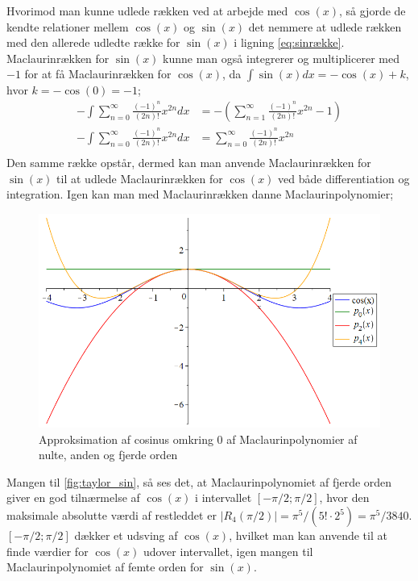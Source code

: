 Hvorimod man kunne udlede rækken ved at arbejde med $\cos(x)$, så gjorde de kendte relationer mellem $\cos(x)$ og $\sin(x)$ det nemmere at udlede rækken med den allerede udledte række for $\sin(x)$ i ligning \ref{eq:sinrække}. Maclaurinrækken  for $\sin(x)$ kunne man også integrerer og multiplicerer med $-1$ for at få Maclaurinrækken for $\cos(x)$, da $\int \sin(x) dx=-\cos(x)+k$, hvor $k=-\cos(0)=-1$;
\begin{align*}
-\int \sum_{n=0}^{\infty} \frac{(-1)^n}{(2n)!}x^{2n} dx
&=
-\left(\sum_{n=1}^{\infty} \frac{(-1)^n}{(2n)!}x^{2n}-1\right) \\
-\int \sum_{n=0}^{\infty} \frac{(-1)^n}{(2n)!}x^{2n} dx
&=
\sum_{n=0}^{\infty} \frac{(-1)^n}{(2n)!}x^{2n} \\
\end{align*}
Den samme række opstår, dermed kan man anvende Maclaurinrækken for $\sin(x)$ til at udlede Maclaurinrækken for $\cos(x)$ ved både differentiation og integration. Igen kan man med Maclaurinrækken danne Maclaurinpolynomier;
\begin{figure}[H]
	\centering
	\includegraphics[scale=0.4]{fig/img/taylor_cos}
	\caption{Approksimation af cosinus omkring 0 af Maclaurinpolynomier af nulte, anden og fjerde orden}
 	\label{fig:taylor_cos}
\end{figure}
Mangen til \ref{fig:taylor_sin}, så ses det, at Maclaurinpolynomiet af fjerde orden giver en god tilnærmelse af $\cos(x)$ i intervallet $[-\pi /2; \pi /2]$, hvor den maksimale absolutte værdi af restleddet er $\left\lvert R_4(\pi/2) \right\lvert = \pi^5/(5! \cdot 2^5) = \pi^5/3840$. $[-\pi /2; \pi /2]$ dækker et udsving af $\cos(x)$, hvilket man kan anvende til at finde værdier for $\cos(x)$ udover intervallet, igen mangen til Maclaurinpolynomiet af femte orden for $\sin(x)$.
